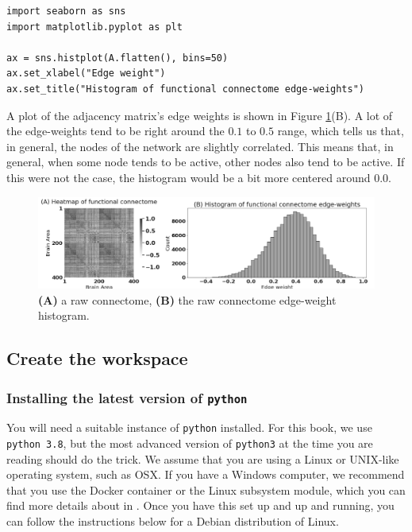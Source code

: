 \begin{lstlisting}[style=python]
import seaborn as sns
import matplotlib.pyplot as plt

ax = sns.histplot(A.flatten(), bins=50)
ax.set_xlabel("Edge weight")
ax.set_title("Histogram of functional connectome edge-weights")
\end{lstlisting}
A plot of the adjacency matrix's edge weights is shown in Figure \ref{fig:ch2:raw}(B). A lot of the edge-weights tend to be right around the $0.1$ to $0.5$ range, which tells us that, in general, the nodes of the network are {slightly correlated}. This means that, in general, when some node tends to be active, other nodes also tend to be active. If this were not the case, the histogram would be a bit more centered around $0.0$.

\begin{figure}[h]
    \centering
    \includegraphics[width=\linewidth]{foundations/ch2/Images/raw.png}
    \caption[Visualizing connectome data]{\textbf{(A)} a raw connectome, \textbf{(B)} the raw connectome edge-weight histogram.}
    \label{fig:ch2:raw}
\end{figure}

\subsection{Create the workspace}
\label{sec:ch2:get:install}
\subsubsection*{Installing the latest version of \texttt{python}}

You will need a suitable instance of \texttt{python} installed. For this book, we use \texttt{python 3.8}, but the most advanced version of \texttt{python3} at the time you are reading should do the trick. We assume that you are using a Linux or UNIX-like operating system, such as OSX. If you have a Windows computer, we recommend that you use the Docker container or the Linux subsystem module, which you can find more details about in \cite{windowsss}. Once you have this set up and up and running, you can follow the instructions below for a Debian distribution of Linux.

